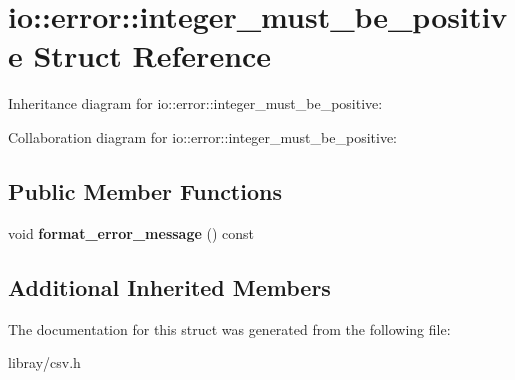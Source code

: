 \hypertarget{structio_1_1error_1_1integer__must__be__positive}{}\section{io\+:\+:error\+:\+:integer\+\_\+must\+\_\+be\+\_\+positive Struct Reference}
\label{structio_1_1error_1_1integer__must__be__positive}


Inheritance diagram for io\+:\+:error\+:\+:integer\+\_\+must\+\_\+be\+\_\+positive\+:


Collaboration diagram for io\+:\+:error\+:\+:integer\+\_\+must\+\_\+be\+\_\+positive\+:
\subsection*{Public Member Functions}
\begin{DoxyCompactItemize}
\item 
\mbox{\label{structio_1_1error_1_1integer__must__be__positive_af6daaa02512141958a3eafd0c07232ef}} 
void {\bfseries format\+\_\+error\+\_\+message} () const
\end{DoxyCompactItemize}
\subsection*{Additional Inherited Members}


The documentation for this struct was generated from the following file\+:\begin{DoxyCompactItemize}
\item 
libray/csv.\+h\end{DoxyCompactItemize}
